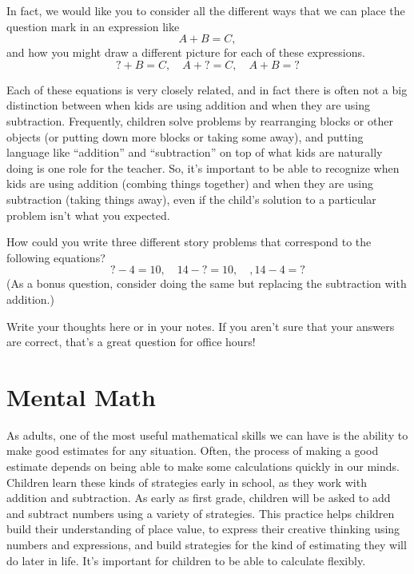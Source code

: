 \documentclass{ximera}
\begin{document}
In fact, we would like you to consider all the different ways that we can place the question mark in an expression like
\[
A + B = C, 
\]
and how you might draw a different picture for each of these expressions.
\[
? + B = C, \quad A + ? = C, \quad A + B = ?
\]

Each of these equations is very closely related, and in fact there is often not a big distinction between when kids are using addition and when they are using subtraction. Frequently, children solve problems by rearranging blocks or other objects (or putting down more blocks or taking some away), and putting language like ``addition'' and ``subtraction'' on top of what kids are naturally doing is one role for the teacher. So, it's important to be able to recognize when kids are using addition (combing things together) and when they are using subtraction (taking things away), even if the child's solution to a particular problem isn't what you expected.

\begin{question}
How could you write three different story problems that correspond to the following equations?
\[
? - 4 = 10, \quad 14 - ? = 10, \quad, 14-4=?
\]
(As a bonus question, consider doing the same but replacing the subtraction with addition.)
\begin{freeResponse}
Write your thoughts here or in your notes. If you aren't sure that your answers are correct, that's a great question for office hours!
\end{freeResponse}
\end{question}



\section{Mental Math}

As adults, one of the most useful mathematical skills we can have is the ability to make good estimates for any situation. Often, the process of making a good estimate depends on being able to make some calculations quickly in our minds. Children learn these kinds of strategies early in school, as they work with addition and subtraction. As early as first grade, children will be asked to add and subtract numbers using a variety of strategies. This practice helps children build their understanding of place value, to express their creative thinking using numbers and expressions, and build strategies for the kind of estimating they will do later in life. It's important for children to be able to calculate flexibly.
\end{document}

